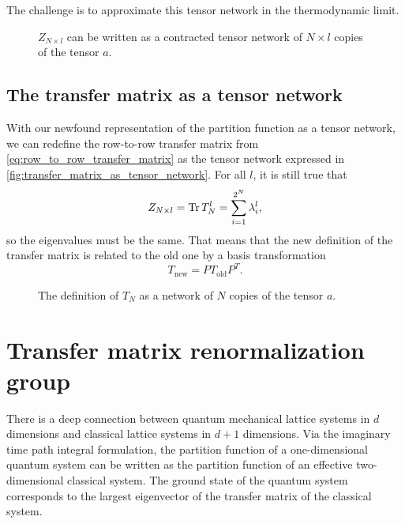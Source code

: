 The challenge is to approximate this tensor network in the thermodynamic limit.

\begin{figure}
  
  \caption{$Z_{N \times l}$ can be written as a contracted tensor network of $N \times l$
  copies of the tensor $a$.}
  \label{fig:2d_ising_as_tensor_network}
\end{figure}

\subsection{The transfer matrix as a tensor network}

With our newfound representation of the partition function as a tensor network, we can
redefine the row-to-row transfer matrix from
\autoref{eq:row_to_row_transfer_matrix} as the tensor network expressed in
\autoref{fig:transfer_matrix_as_tensor_network}. For all $l$, it is still true that
\begin{equation}
  Z_{N \times l} = \operatorname{Tr} T_{N}^{l} = \sum_{i = 1}^{2^N} \lambda_{i}^{l},
\end{equation}
so the eigenvalues must be the same. That means that the new definition of the transfer
matrix is related to the old one by a basis transformation
\begin{equation}
  T_{\text{new}} = P T_{\text{old}} P^{T}.
\end{equation}

\begin{figure}
  
  \caption{The definition of $T_N$ as a network of $N$ copies of the tensor $a$.}
  \label{fig:transfer_matrix_as_tensor_network}
\end{figure}

\section{Transfer matrix renormalization group}
There is a deep connection between quantum mechanical lattice systems in $d$ dimensions
and classical lattice systems in $d + 1$ dimensions. Via the imaginary time path integral
formulation, the partition function of a one-dimensional quantum system can be written as
the partition function of an effective two-dimensional classical system. The ground state
of the quantum system corresponds to the largest eigenvector of the transfer matrix of the
classical system.

